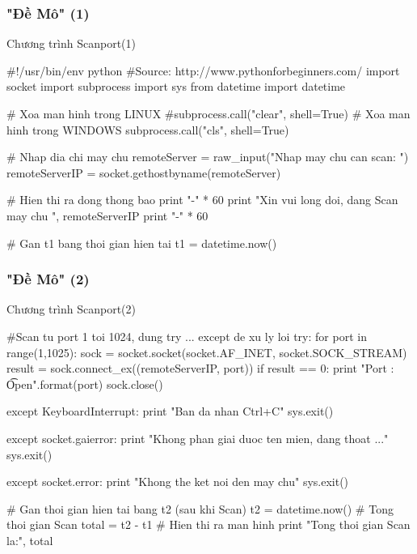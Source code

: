 \documentclass[10pt]{beamer}
\newcommand\sFontvi{\fontsize{8}{7.2}\selectfont} %
\begin{document}
\begin{frame}[fragile] \label{Demo - phan 1}
\frametitle{"Đề Mô" (1)}
\begin{block}{Chương trình Scanport(1)}\label{Chuong trinh scan port phan 1}
\sFontvi
\begin{python}
#!/usr/bin/env python
#Source: http://www.pythonforbeginners.com/
import socket
import subprocess
import sys
from datetime import datetime

# Xoa man hinh trong LINUX
#subprocess.call("clear", shell=True)
# Xoa man hinh trong WINDOWS
subprocess.call("cls", shell=True)

# Nhap dia chi may chu
remoteServer    = raw_input("Nhap may chu can scan: ")
remoteServerIP  = socket.gethostbyname(remoteServer)

# Hien thi ra dong thong bao
print "-" * 60
print "Xin vui long doi, dang Scan may chu ", remoteServerIP
print "-" * 60

# Gan t1 bang thoi gian hien tai
t1 = datetime.now()
\end{python}
\end{block}
\end{frame}
\begin{frame}[fragile]\label{Demo - phan 2}
\frametitle{"Đề Mô" (2)}
\begin{block}{Chương trình Scanport(2)}\label{Chuong trinh scan port phan 2}
\sFontvi
\begin{python}
#Scan tu port 1 toi 1024, dung try ... except de xu ly loi
try:
    for port in range(1,1025):  
        sock = socket.socket(socket.AF_INET, socket.SOCK_STREAM)
        result = sock.connect_ex((remoteServerIP, port))
        if result == 0:
            print "Port {}: \t Open".format(port)
        sock.close()

except KeyboardInterrupt:
    print "Ban da nhan Ctrl+C"
    sys.exit()

except socket.gaierror:
    print "Khong phan giai duoc ten mien, dang thoat ..."
    sys.exit()

except socket.error:
    print "Khong the ket noi den may chu"
    sys.exit()

# Gan thoi gian hien tai bang t2 (sau khi Scan)
t2 = datetime.now()
# Tong thoi gian Scan
total =  t2 - t1
# Hien thi ra man hinh
print "Tong thoi gian Scan la:", total
\end{python}
\end{block}
\end{frame}
\end{document}
